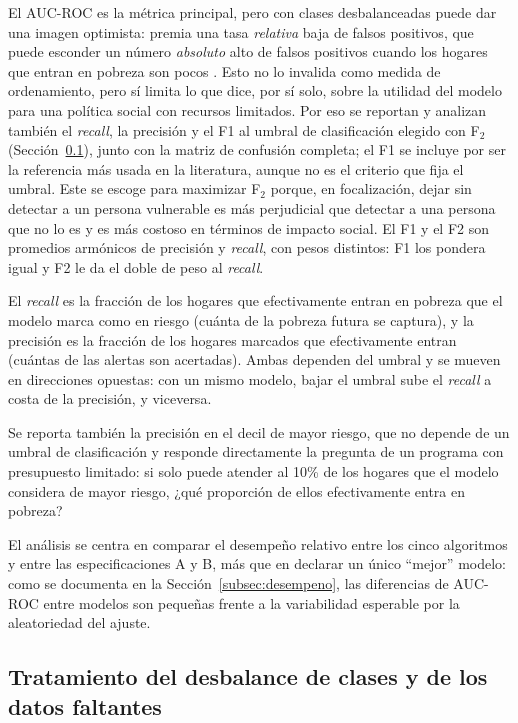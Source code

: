 \documentclass[12pt, letterpaper]{article}
\begin{document}
El AUC-ROC es la métrica principal, pero con clases desbalanceadas puede
dar una imagen optimista: premia una tasa \emph{relativa} baja de falsos
positivos, que puede esconder un número \emph{absoluto} alto de falsos
positivos cuando los hogares que entran en pobreza son pocos
\parencite{davis2006,saito2015}. Esto no lo invalida como medida de
ordenamiento, pero sí limita lo que dice, por sí solo, sobre la utilidad
del modelo para una política social con recursos limitados. Por eso se reportan
y analizan también el \emph{recall}, la precisión y el F1 al umbral de clasificación
elegido con F$_2$ (Sección~\ref{subsec:desbalance}), junto con la matriz
de confusión completa; el F1 se incluye por ser la referencia más usada en
la literatura, aunque no es el criterio que fija el umbral. Este se escoge para 
maximizar F$_2$ porque, en focalización, dejar sin detectar a un
persona vulnerable es más perjudicial que detectar a una persona que no lo es y es
más costoso en términos de impacto social. El F1 y el F2 son promedios 
armónicos de precisión y \emph{recall}, con pesos distintos: F1 los pondera igual 
y F2 le da el doble de peso al \emph{recall}.

El \emph{recall} es la fracción de los hogares que efectivamente entran en
pobreza que el modelo marca como en riesgo (cuánta de la pobreza futura se
captura), y la precisión es la fracción de los hogares marcados que
efectivamente entran (cuántas de las alertas son acertadas). Ambas
dependen del umbral y se mueven en direcciones opuestas: con un mismo
modelo, bajar el umbral sube el \emph{recall} a costa de la precisión, y
viceversa.  

Se reporta también la precisión en el decil de mayor riesgo, que no depende de un
umbral de clasificación y responde directamente la pregunta de un
programa con presupuesto limitado: si solo puede atender al 10\% de los
hogares que el modelo considera de mayor riesgo, ¿qué proporción de ellos
efectivamente entra en pobreza?

El análisis se centra en comparar el desempeño relativo entre los cinco
algoritmos y entre las especificaciones A y B, más que en declarar un
único ``mejor'' modelo: como se documenta en la
Sección~\ref{subsec:desempeno}, las diferencias de AUC-ROC entre modelos
son pequeñas frente a la variabilidad esperable por la aleatoriedad del
ajuste.

\subsection{Tratamiento del desbalance de clases y de los datos faltantes}
\label{subsec:desbalance}
\end{document}
